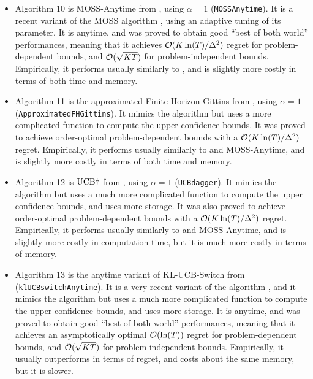 \begin{itemize}
    \item Algorithm 10 is
    $\mathrm{MOSS}$-$\mathrm{Anytime}$ from \cite{Degenne16}, using $\alpha=1$ (\texttt{MOSSAnytime}).
    It is a recent variant of the $\mathrm{MOSS}$ algorithm \cite{BubeckSlivkins12}, using an adaptive tuning of its parameter. It is anytime, and was proved to obtain good ``best of both world'' performances, meaning that it achieves $\mathcal{O}(K\ln(T)/\Delta^2)$ regret for problem-dependent bounds, and $\mathcal{O}(\sqrt{KT})$ for problem-independent bounds.
    Empirically, it performs usually similarly to \UCB, and is slightly more costly in terms of both time and memory.

    \item Algorithm 11 is
    the approximated Finite-Horizon Gittins from \cite{Lattimore16a}, using $\alpha=1$ (\texttt{ApproximatedFHGittins}).
    It mimics the \UCB{} algorithm but uses a more complicated function to compute the upper confidence bounds.
    It was proved to achieve order-optimal problem-dependent bounds with a $\mathcal{O}(K\ln(T)/\Delta^2)$ regret.
    Empirically, it performs usually similarly to \UCB{} and $\mathrm{MOSS}$-$\mathrm{Anytime}$, and is slightly more costly in terms of both time and memory.

    \item Algorithm 12 is
    $\mathrm{UCB}\dagger$ from \cite{Lattimore2018refining}, using $\alpha=1$ (\texttt{UCBdagger}).
    It mimics the \UCB{} algorithm but uses a much more complicated function to compute the upper confidence bounds, and uses more storage.
    It was also proved to achieve order-optimal problem-dependent bounds with a $\mathcal{O}(K\ln(T)/\Delta^2)$ regret.
    Empirically, it performs usually similarly to \UCB{} and $\mathrm{MOSS}$-$\mathrm{Anytime}$, and is slightly more costly in computation time, but it is much more costly in terms of memory.

    \item Algorithm 13 is
    the anytime variant of KL-UCB-Switch from \cite{GarivierHadiji2018} (\texttt{klUCBswitchAnytime}).
    It is a very recent variant of the \klUCB{} algorithm \cite{KLUCBJournal},
    and it mimics the \klUCB{} algorithm but uses a much more complicated function to compute the upper confidence bounds, and uses more storage.
    It is anytime, and was proved to obtain good ``best of both world'' performances, meaning that it achieves an asymptotically optimal $\mathcal{O}(\ln(T))$ regret for problem-dependent bounds, and $\mathcal{O}(\sqrt{KT})$ for problem-independent bounds.
    Empirically, it usually outperforms \klUCB{} in terms of regret, and costs about the same memory, but it is slower.


\end{itemize}
